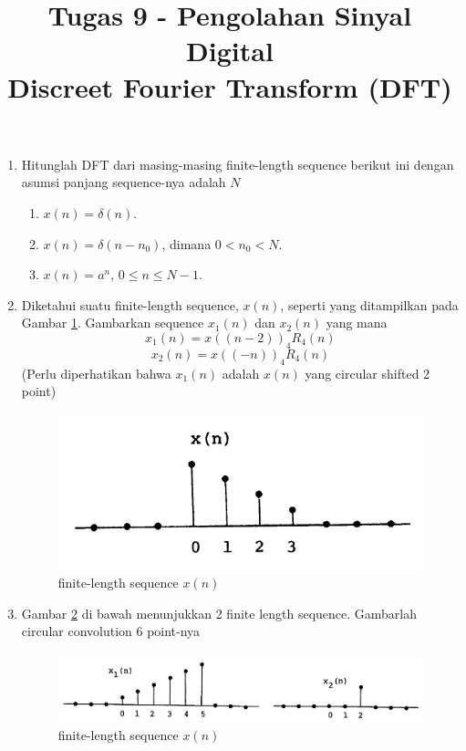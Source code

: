 \documentclass[12pt,a4paper]{article}
\title{Tugas 9 - Pengolahan Sinyal Digital\\
		Discreet Fourier Transform (DFT)}
\date{}
\begin{document}
	\maketitle
	\date{}
	\begin{enumerate}
		\item Hitunglah DFT dari masing-masing finite-length sequence berikut ini dengan asumsi panjang sequence-nya adalah $ N $
		\begin{enumerate}
			\item $ x(n)=\delta(n) $.
			\item $ x(n)=\delta(n-n_{0}) $, dimana $ 0<n_{0}<N $.
			\item $ x(n)=a^{n} $, $ 0\leq n\leq N-1 $.
		\end{enumerate}
	
		\item Diketahui suatu finite-length sequence, $ x(n) $, seperti yang ditampilkan pada Gambar \ref{fig:img01}. Gambarkan sequence $ x_1(n) $ dan $ x_2(n) $ yang mana \[ x_1(n) = x((n-2))_4 R_4(n) \] \[ x_2(n) = x((-n))_4 R_4(n) \] (Perlu diperhatikan bahwa $ x_1(n) $ adalah $ x(n) $ yang circular shifted 2 point)
		
		\begin{figure}[H]
			\centering
			\includegraphics[width=0.5\linewidth]{img/img01}
			\caption{finite-length sequence $ x(n) $}
			\label{fig:img01}
		\end{figure}
		
		\item Gambar \ref{fig:img02} di bawah menunjukkan 2 finite length sequence. Gambarlah circular convolution 6 point-nya
		
		\begin{figure}[H]
			\centering
			\includegraphics[width=0.7\linewidth]{img/img02}
			\caption{finite-length sequence $ x(n) $}
			\label{fig:img02}
		\end{figure}
	
	\end{enumerate}
\end{document}
